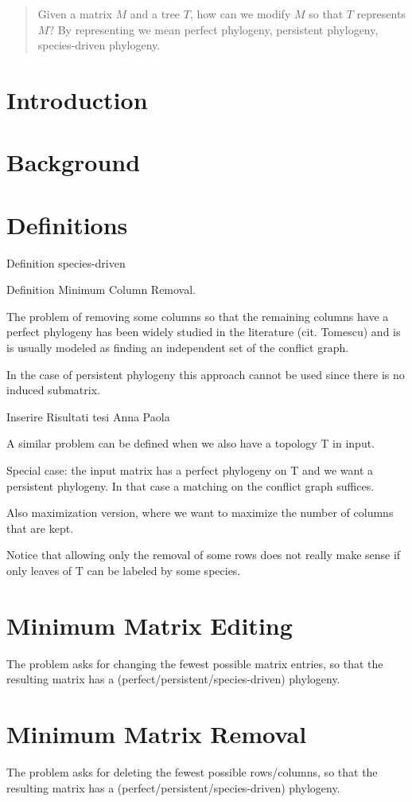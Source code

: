 \begin{abstract}
Given a matrix $M$ and a tree $T$, how can we modify $M$ so that $T$ represents $M$?
By representing we mean perfect phylogeny, persistent phylogeny, species-driven phylogeny.
\end{abstract}
 
 
\section{Introduction}
\section{Background}
\section{Definitions}

Definition species-driven

Definition Minimum Column Removal.

The problem of removing some columns so that the remaining columns have a perfect phylogeny has been widely studied in the literature (cit. Tomescu) and is is usually modeled as finding an independent set of the conflict graph.

In the case of persistent phylogeny this approach cannot be used since there is no induced submatrix.

Inserire Risultati tesi Anna Paola

A similar problem can be defined when we also have a topology T in input.

Special case: the input matrix has a perfect phylogeny on T and we want a persistent phylogeny. In that case a matching on the conflict graph suffices.

Also maximization version, where we want to maximize the number of columns that are kept.

Notice that allowing only the removal of some rows does not really make sense if only leaves of T can be labeled by some species.
\section{Minimum Matrix Editing}

The problem asks for changing the fewest possible matrix entries, so that the resulting matrix has a (perfect/persistent/species-driven) phylogeny.

\section{Minimum Matrix Removal}

The problem asks for deleting the fewest possible rows/columns, so that the resulting matrix has a (perfect/persistent/species-driven) phylogeny.

